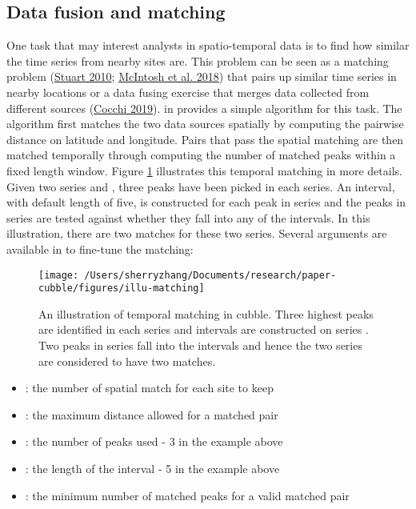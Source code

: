 \documentclass{article}
\providecommand{\tightlist}{%
  \setlength{\itemsep}{0pt}\setlength{\parskip}{0pt}}
\begin{document}
\hypertarget{data-fusion-and-matching}{%
\subsection{Data fusion and matching}\label{data-fusion-and-matching}}

One task that may interest analysts in spatio-temporal data is to find how similar the time series from nearby sites are. This problem can be seen as a matching problem (\protect\hyperlink{ref-stuart2010matching}{Stuart 2010}; \protect\hyperlink{ref-mcintosh2018using}{McIntosh et al. 2018}) that pairs up similar time series in nearby locations or a data fusing exercise that merges data collected from different sources (\protect\hyperlink{ref-cocchi2019data}{Cocchi 2019}).  in  provides a simple algorithm for this task. The algorithm first matches the two data sources spatially by computing the pairwise distance on latitude and longitude. Pairs that pass the spatial matching are then matched temporally through computing the number of matched peaks within a fixed length window. Figure \ref{fig:illu-matching} illustrates this temporal matching in more details. Given two series  and , three peaks have been picked in each series. An interval, with default length of five, is constructed for each peak in series  and the peaks in series  are tested against whether they fall into any of the intervals. In this illustration, there are two matches for these two series. Several arguments are available in  to fine-tune the matching:

\begin{figure}
\texttt{[image: /Users/sherryzhang/Documents/research/paper-cubble/figures/illu-matching]} \caption{An illustration of temporal matching in cubble. Three highest peaks are identified in each series and intervals are constructed on series . Two peaks in series  fall into the intervals and hence the two series are considered to have two matches.}\label{fig:illu-matching}
\end{figure}

\begin{itemize}
\tightlist
\item
  : the number of spatial match for each site to keep
\item
  : the maximum distance allowed for a matched pair
\item
  : the number of peaks used - 3 in the example above
\item
  : the length of the interval - 5 in the example above
\item
  : the minimum number of matched peaks for a valid matched pair
\end{itemize}
\end{document}
